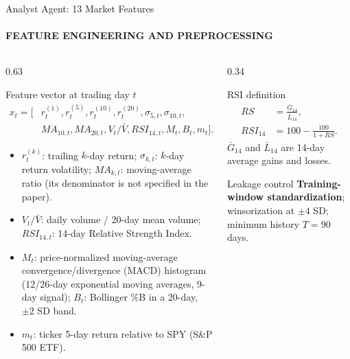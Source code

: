 \documentclass[aspectratio=169,11pt]{beamer}
\newcommand{\keyphrase}[1]{\textbf{\color{DELCONred}#1}}
\begin{document}
\begin{frame}{Analyst Agent: 13 Market Features}
  \framesubtitle{FEATURE ENGINEERING AND PREPROCESSING}
  \begin{columns}[T,onlytextwidth]
    \begin{column}{0.63\textwidth}
      \begin{block}{Feature vector at trading day $t$}
        \scriptsize
        \begin{equation*}
          \begin{aligned}
            x_t=\big[&r_t^{(1)},r_t^{(5)},r_t^{(10)},r_t^{(20)},\sigma_{5,t},\sigma_{10,t},\\
            &MA_{10,t},MA_{20,t},V_t/\bar V,RSI_{14,t},M_t,B_t,m_t\big].
          \end{aligned}
        \end{equation*}
        \vspace{-0.25em}
        \begin{itemize}\setlength{\itemsep}{1pt}
          \item \keyphrase{$r_t^{(k)}$}: trailing $k$-day return; $\sigma_{k,t}$: $k$-day return volatility; $MA_{k,t}$: moving-average ratio (its denominator is not specified in the paper).
          \item \keyphrase{$V_t/\bar V$}: daily volume / 20-day mean volume; $RSI_{14,t}$: 14-day Relative Strength Index.
          \item \keyphrase{$M_t$}: price-normalized moving-average convergence/divergence (MACD) histogram (12/26-day exponential moving averages, 9-day signal); $B_t$: Bollinger \%B in a 20-day, $\pm2$ SD band.
          \item \keyphrase{$m_t$}: ticker 5-day return relative to SPY (S\&P 500 ETF).
        \end{itemize}
      \end{block}
    \end{column}
    \begin{column}{0.34\textwidth}
      \begin{block}{RSI definition}
        \centering\scriptsize
        \begin{align*}
          RS&=\frac{\bar G_{14}}{\bar L_{14}},\\
          RSI_{14}&=100-\frac{100}{1+RS}.
        \end{align*}
        \scriptsize $\bar G_{14}$ and $\bar L_{14}$ are 14-day average gains and losses.
      \end{block}
      \begin{alertblock}{Leakage control}
        \scriptsize \keyphrase{Training-window standardization}; winsorization at $\pm4$ SD; minimum history $T=90$ days.
      \end{alertblock}
    \end{column}
  \end{columns}
\end{frame}
\end{document}
